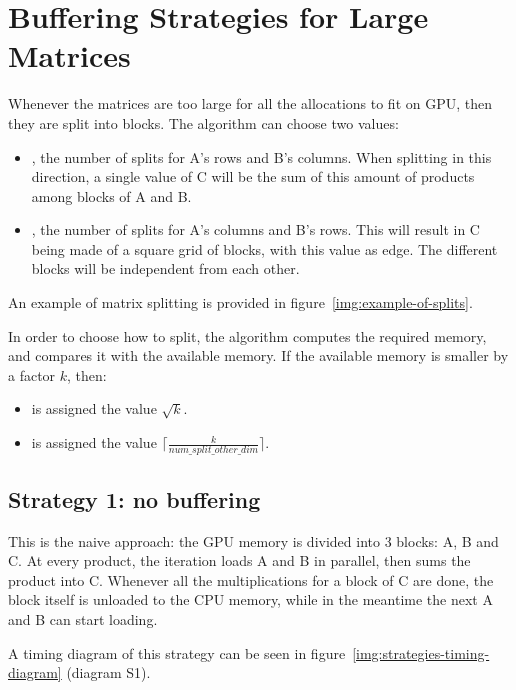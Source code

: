 \section{Buffering Strategies for Large Matrices}
\label{sec:strategies}


Whenever the matrices are too large for all the allocations to fit on GPU, then they are split into blocks.
The algorithm can choose two values:
\begin{itemize}
	\item {}, the number of splits for A's rows and B's columns. When splitting in this direction, a single value of C will be the sum of this amount of products among blocks of A and B.
	\item{}, the number of splits for A's columns and B's rows. This will result in C being made of a square grid of blocks, with this value as edge. The different blocks will be independent from each other.
\end{itemize}

An example of matrix splitting is provided in figure~\ref{img:example-of-splits}.


In order to choose how to split, the algorithm computes the required memory, and compares it with the available memory.
If the available memory is smaller by a factor $k$, then:
\begin{itemize}
	\itemsep 0em
	\item {} is assigned the value $\sqrt{k}$.
	\item{} is assigned the value $\lceil \frac{k}{num\_split\_other\_dim} \rceil$.
\end{itemize}

\subsection{Strategy 1: no buffering}

This is the naive approach: the GPU memory is divided into 3 blocks: A, B and C.
At every product, the iteration loads A and B in parallel, then sums the product into C.
Whenever all the multiplications for a block of C are done, the block itself is unloaded to the CPU memory, while in the meantime the next A and B can start loading.

A timing diagram of this strategy can be seen in figure~\ref{img:strategies-timing-diagram} (diagram S1).

